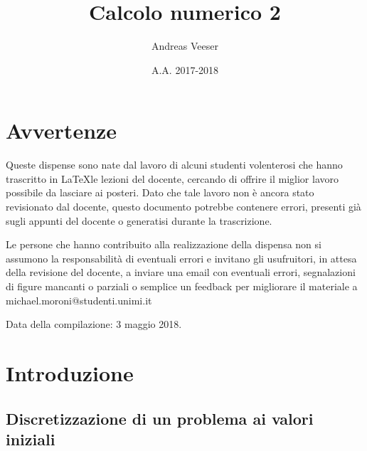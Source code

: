 \documentclass[hidelinks, 10pt]{report}
\author{Andreas Veeser}
\date{A.A. 2017-2018}
\title{Calcolo numerico 2}
\begin{document}
\providecommand{\defeq}{\vcentcolon=}
\providecommand{\eqdef}{=\vcentcolon}
\providecommand{\compl}[1]{\prescript{c}{}{#1}}
\providecommand{\refsec}[1]{\S \ref{section:#1}}
\theoremstyle{plain}
\newtheorem{thm}{Teorema}[]

\theoremstyle{definition}
\newtheorem{defn}[]{Definizione}
\newtheorem{prop}[]{Proposizione}
\newtheorem{cor}[]{Corollario}
\newtheorem{lem}[]{Lemma}
\newtheorem{oss}[]{Osservazione}
\newtheorem{nota}[]{Nota}
\newtheorem{es}[]{Esempio}
\newtheorem{ex}[]{Esercizio}

\renewcommand{\thesection}{\arabic{section}}
\renewcommand{\thepage}{\roman{page}}
\renewcommand{\theequation}{\thesection.\Alph{equation}}
\renewcommand{\thefigure}{\thesection.\alph{figure}}
\maketitle

\tableofcontents

\chapter*{Avvertenze}
Queste dispense sono nate dal lavoro di alcuni studenti volenterosi che hanno trascritto in \LaTeX le lezioni del docente, cercando di offrire il miglior lavoro possibile da lasciare ai posteri. Dato che tale lavoro non \`e ancora stato revisionato dal docente, questo documento potrebbe contenere errori, presenti gi\`a sugli appunti del docente o generatisi durante la trascrizione.

Le persone che hanno contribuito alla realizzazione della dispensa non si assumono la responsabilit\`a di eventuali errori e invitano gli usufruitori, in attesa della revisione del docente, a inviare una email con eventuali errori, segnalazioni di figure mancanti o parziali o semplice un feedback per migliorare il materiale a michael.moroni@studenti.unimi.it

Data della compilazione: 3 maggio 2018.

\chapter{Introduzione}
\renewcommand{\thepage}{\arabic{page}}
\setcounter{page}{1}
\section{Discretizzazione di un problema ai valori iniziali}	\label{section:1}
\end{document}
